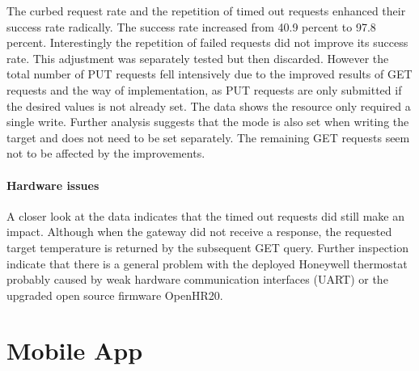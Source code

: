 The curbed request rate and the repetition of timed out  requests enhanced their success rate radically.
The success rate increased from 40.9 percent to 97.8 percent.
Interestingly the repetition of failed  requests did not improve its success rate.
This adjustment was separately tested but then discarded.
However the total number of PUT requests fell intensively due to the improved results of GET requests and the way of implementation, as PUT requests are only submitted if the desired values is not already set.
The data shows the resource  only required a single write.
Further analysis suggests that the mode is also set when writing the target and does not need to be set separately.
The remaining GET requests seem not to be affected by the improvements.

\paragraph{Hardware issues}

A closer look at the data indicates that the timed out  requests did still make an impact.
Although when the gateway did not receive a response, the requested target temperature is returned by the subsequent GET query.
Further inspection indicate that there is a general problem with the deployed Honeywell thermostat probably caused by weak hardware communication interfaces (UART) or the upgraded open source firmware OpenHR20.




\section{Mobile App}


